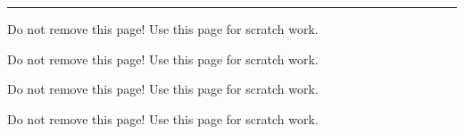 \documentclass[12pt,addpoints]{exam}
\begin{document}
\begin{center}
    \pointtable[v][questions]
\end{center}

\noindent
\rule[2ex]{\textwidth}{2pt}
\newpage


\clearpage
\begin{questions}
%
%
% 

\clearpage

\clearpage

\clearpage

\clearpage

\clearpage
%
\end{questions}

\clearpage
\begin{center}
Do not remove this page! Use this page for scratch work.
\end{center}
\clearpage
\begin{center}
Do not remove this page! Use this page for scratch work.
\end{center}
\clearpage
\begin{center}
Do not remove this page! Use this page for scratch work.
\end{center}
\clearpage
\begin{center}
Do not remove this page! Use this page for scratch work.
\end{center}
\end{document}
